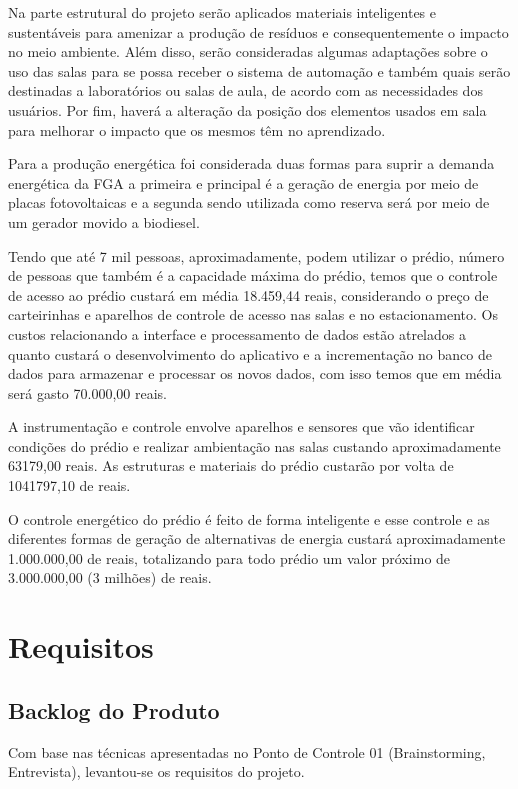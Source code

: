 Na parte estrutural do projeto serão aplicados materiais inteligentes e sustentáveis para amenizar a produção de resíduos e consequentemente o impacto no meio ambiente. Além disso, serão consideradas algumas adaptações sobre o uso das salas para se possa receber o sistema de automação e também quais serão destinadas a laboratórios ou salas de aula, de acordo com as necessidades dos usuários. Por fim, haverá a alteração da posição dos elementos usados em sala para melhorar o impacto que os mesmos têm no aprendizado.

Para a produção energética foi considerada duas formas para suprir a demanda energética da FGA a primeira e principal é a geração de energia por meio de placas fotovoltaicas e a segunda sendo utilizada como reserva será por meio de um gerador movido a biodiesel.

Tendo que até 7 mil pessoas, aproximadamente, podem utilizar o prédio, número de pessoas que também é a capacidade máxima do prédio, temos que o controle de acesso ao prédio custará em média 18.459,44 reais, considerando o preço de carteirinhas e aparelhos de controle de acesso nas salas e no estacionamento. Os custos relacionando a interface e processamento de dados estão atrelados a quanto custará o desenvolvimento do aplicativo e a incrementação no banco de dados para armazenar e processar os novos dados, com isso temos que em média será gasto 70.000,00 reais.

A instrumentação e controle envolve aparelhos e sensores que vão identificar condições do prédio e realizar ambientação nas salas custando aproximadamente 63179,00 reais. As estruturas e materiais do prédio custarão por volta de 1041797,10 de reais.

O controle energético do prédio é feito de forma inteligente e esse controle e as diferentes formas de geração de alternativas de energia custará aproximadamente 1.000.000,00 de reais, totalizando para todo prédio um valor próximo de 3.000.000,00 (3 milhões) de reais.

\chapter{Requisitos\label{ch:requisitos}}
\section{Backlog do Produto}
Com base nas técnicas apresentadas no Ponto de Controle 01 (Brainstorming, Entrevista), levantou-se os requisitos do projeto.

